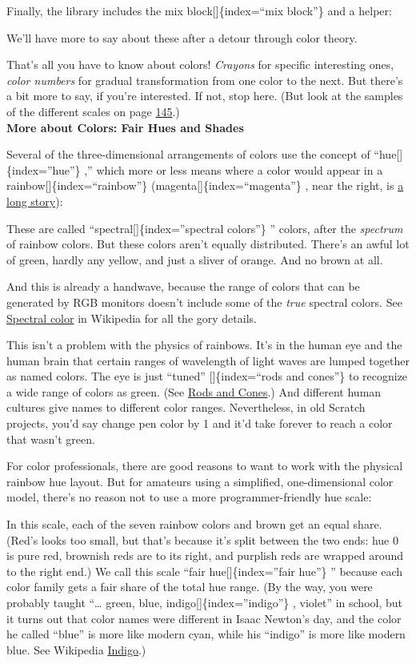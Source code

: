 \documentclass[
  letterpaper,
]{book}
\begin{document}
Finally, the library includes the mix block{[}{]}\{index=``mix block''\}
and a helper:

We'll have more to say about these after a detour through color theory.

That's all you have to know about colors! \emph{Crayons} for specific
interesting ones, \emph{color numbers} for gradual transformation from
one color to the next. But there's a bit more to say, if you're
interested. If not, stop here. (But look at the samples of the different
scales on page \hyperref[spirals]{145}.)\\
\textbf{More about Colors: Fair Hues and Shades}

Several of the three-dimensional arrangements of colors use the concept
of ``hue{[}{]}\{index=''hue''\} ,'' which more or less means where a
color would appear in a rainbow{[}{]}\{index=``rainbow''\}
(magenta{[}{]}\{index=``magenta''\} , near the right, is
\href{https://en.wikipedia.org/wiki/Magenta}{a long story}):

These are called ``spectral{[}{]}\{index=''spectral colors''\} ''
colors, after the \emph{spectrum} of rainbow colors. But these colors
aren't equally distributed. There's an awful lot of green, hardly any
yellow, and just a sliver of orange. And no brown at all.

And this is already a handwave, because the range of colors that can be
generated by RGB monitors doesn't include some of the \emph{true}
spectral colors. See
\href{https://en.wikipedia.org/wiki/Spectral_color}{Spectral color} in
Wikipedia for all the gory details.

This isn't a problem with the physics of rainbows. It's in the human eye
and the human brain that certain ranges of wavelength of light waves are
lumped together as named colors. The eye is just ``tuned''
{[}{]}\{index=``rods and cones''\} to recognize a wide range of colors
as green. (See
\href{https://en.wikipedia.org/w/index.php?title=Rods_and_cones}{Rods
and Cones}.) And different human cultures give names to different color
ranges. Nevertheless, in old Scratch projects, you'd say change pen
color by 1 and it'd take forever to reach a color that wasn't green.

For color professionals, there are good reasons to want to work with the
physical rainbow hue layout. But for amateurs using a simplified,
one-dimensional color model, there's no reason not to use a more
programmer-friendly hue scale:

In this scale, each of the seven rainbow colors and brown get an equal
share. (Red's looks too small, but that's because it's split between the
two ends: hue 0 is pure red, brownish reds are to its right, and
purplish reds are wrapped around to the right end.) We call this scale
``fair hue{[}{]}\{index=''fair hue''\} '' because each color family gets
a fair share of the total hue range. (By the way, you were probably
taught ``\ldots{} green, blue, indigo{[}{]}\{index=''indigo''\} ,
violet'' in school, but it turns out that color names were different in
Isaac Newton's day, and the color he called ``blue'' is more like modern
cyan, while his ``indigo'' is more like modern blue. See Wikipedia
\href{https://en.wikipedia.org/wiki/Indigo}{Indigo}.)
\end{document}

